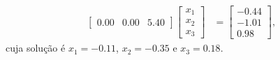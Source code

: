 \documentclass[a4paper,12pt, leqno, answers]{exam}
\begin{document}
\begin{questions}
\begin{solution}
\begin{align*}
\begin{bmatrix}
                0.00 & 0.00 & 5.40
            \end{bmatrix} \begin{bmatrix}
                x_1 \\
                x_2 \\
                x_3
            \end{bmatrix} &= \begin{bmatrix}
                -0.44 \\
                -1.01 \\
                0.98
            \end{bmatrix},
        \end{align*}
        cuja solu\c{c}\~{a}o \'{e} $x_1 = -0.11$, $x_2 = -0.35$ e $x_3 = 0.18$.
    \end{solution}

    \question
    \begin{parts}

\end{parts}
\end{questions}
\end{document}
